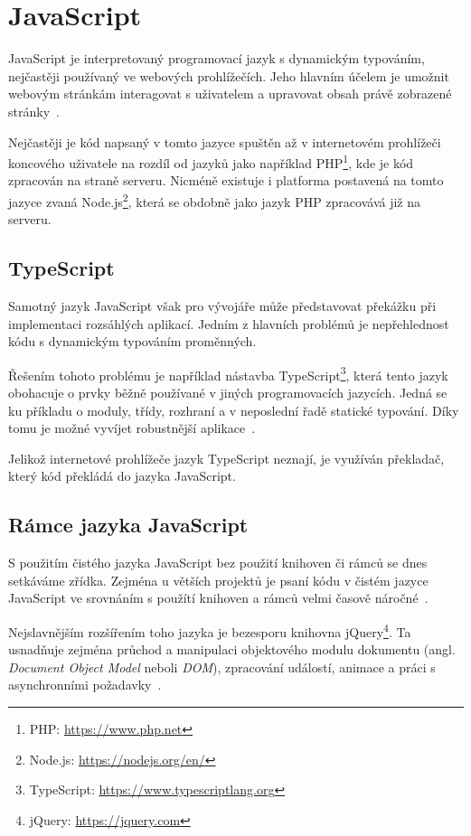 \section{JavaScript}
JavaScript je interpretovaný programovací jazyk s dynamickým typováním, nejčastěji používaný ve webových prohlížečích. Jeho hlavním účelem je umožnit webovým stránkám interagovat s uživatelem a upravovat obsah právě zobrazené stránky~\cite{bib:js-definitive}.

Nejčastěji je kód napsaný v tomto jazyce spuštěn až v internetovém prohlížeči koncového uživatele na rozdíl od jazyků jako například PHP\footnote{PHP: \url{https://www.php.net}}, kde je kód zpracován na straně serveru. Nicméně existuje i platforma postavená na tomto jazyce zvaná Node.js\footnote{Node.js: \url{https://nodejs.org/en/}}, která se obdobně jako jazyk PHP zpracovává již na serveru.


\subsection{TypeScript}
Samotný jazyk JavaScript však pro vývojáře může představovat překážku při implementaci rozsáhlých aplikací. Jedním z hlavních problémů je nepřehlednost kódu s dynamickým typováním proměnných.

Řešením tohoto problému je například nástavba TypeScript\footnote{TypeScript: \url{https://www.typescriptlang.org}}, která tento jazyk obohacuje o prvky běžně používané v jiných programovacích jazycích. Jedná se ku příkladu o moduly, třídy, rozhraní a v neposlední řadě statické typování. Díky tomu je možné vyvíjet robustnější aplikace~\cite{bib:typescript}.
 
Jelikož internetové prohlížeče jazyk TypeScript neznají, je využíván překladač, který kód překládá do jazyka JavaScript.


\subsection{Rámce jazyka JavaScript}
S použitím čistého jazyka JavaScript bez použití knihoven či rámců se dnes setkáváme zřídka. Zejména u větších projektů je psaní kódu v čistém jazyce JavaScript ve srovnáním s použítí knihoven a rámců velmi časově náročné~\cite{bib:vanilla-js}.

Nejslavnějším rozšířením toho jazyka je bezesporu knihovna jQuery\footnote{jQuery: \url{https://jquery.com}}. Ta usnadňuje zejména průchod a manipulaci objektového modulu dokumentu (angl. \emph{Document Object Model} neboli \emph{DOM}), zpracování událostí, animace a práci s asynchronními požadavky~\cite{bib:jquery}.

